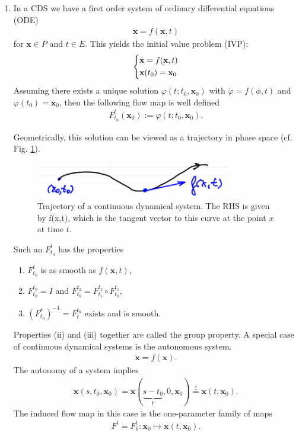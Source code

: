 \begin{enumerate}
\item In a CDS we have a first order system of ordinary differential equations (ODE)
	\begin{align}
		\boxed{
			\dot{ \textbf{x}} = f( \textbf{x},t)
		}
	\end{align}
	for $ \textbf{x}\in P$ and $t \in E$. This yields the initial value problem (IVP):
	\begin{align}
		\begin{dcases}
			\dot{ \textbf{x}} = f( \textbf{x},t) \\
			 \textbf{x}(t_0) =  \textbf{x}_0
		\end{dcases}
	\end{align}
	Assuming there exists a unique solution $\varphi(t; t_0,  \textbf{x}_0)$ with $\dot{\varphi} = f(\phi,t)$ and $\varphi(t_0)=  \textbf{x}_0$, then the following flow map is well defined
	\begin{align}
		\boxed{
		F_{t_0}^{t}( \textbf{x}_0) := \varphi(t; t_0,  \textbf{x}_0).}
	\end{align}

Geometrically, this solution can be viewed as a trajectory in phase space (cf. Fig. \ref{fig:cds_traj}).
	\begin{figure}[h!]
	\centering
	\includegraphics[width = 0.8\textwidth]{figures/intro/2CDS.png}
	\caption{Trajectory of a continuous dynamical system. The RHS is given by f(x,t), which is the tangent vector to this curve at the point $x$ at time $t$.} \label{fig:cds_traj}
	\end{figure}
	
	Such an $F_{t_0}^{t}$ has the properties
	\begin{enumerate}
		\item $F_{t_0}^{t}$ is as smooth as $f( \textbf{x},t)$,
		\item $F_{t_0}^{t_0} = I$ and $F_{t_0}^{t_2} = F_{t_1}^{t_2} \circ F_{t_0}^{t_1}$,
		\item $\left(F_{t_0}^{t}\right)^{-1} = F_{t}^{t_0}$ exists and is smooth.
\end{enumerate}
Properties (ii) and (iii) together are called the group property. A special case of continuous dynamical systems is the autonomous system.
\begin{align}
	\boxed{\dot{ \textbf{x}} = f( \textbf{x}).}	
\end{align}
The autonomy of a system implies
\begin{align}
	 \textbf{x}(s,t_0,  \textbf{x}_0) =  \textbf{x}(\underbrace{s-t_0}_{t}, 0,  \textbf{x}_0) \stackrel{!}{=}  \textbf{x}(t, \textbf{x}_0).
\end{align}
The induced flow map in this case is the one-parameter family of maps
\begin{align}
	\boxed{ F^{t} = F_{0}^{t}:  \textbf{x}_0 \mapsto  \textbf{x}(t, \textbf{x}_0).}
\end{align}
\end{enumerate}
